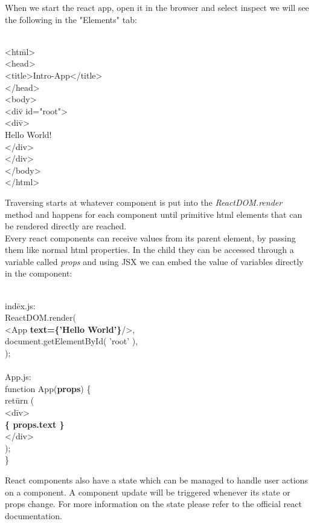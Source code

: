 When we start the react app, open it in the browser and select inspect we will see the following in the "Elements" tab:
\begin{exmp}
\label{ex252}
\begin{tabbing}
\\
<ht\=ml> \\
<head> \\
\> <title>Intro-App</title> \\
</head> \\
<body> \\
\> <di\=v id="root"> \\
\> \> <di\=v> \\
\> \> \> Hello World! \\
\> \> </div> \\
\> </div> \\
</body> \\
</html>
\end{tabbing}
\end{exmp}
Traversing starts at whatever component is put into the \emph{ReactDOM.render} method and happens for each component until primitive html elements that can be rendered directly are reached. \\
Every react components can receive values from its parent element, by passing them like normal html properties. In the child they can be accessed through a variable called \emph{props} and using JSX we can embed the value of variables directly in the component:

\begin{exmp}
\label{ex253}
\begin{tabbing}
\\
ind\=ex.js: \\
ReactDOM.render( \\
\>	<App \textbf{text=\{'Hello World'\}}/>, \\
\>	document.getElementById( 'root' ), \\
); \\
\\
App.js: \\
function App(\textbf{props}) \{ \\
\>  ret\=urn ( \\
\>\>    <d\=iv> \\
\>\>\>     \textbf{\{ props.text \}}\\
\>\>   </div> \\
\>  ); \\
\}
\end{tabbing}
\end{exmp}
React components also have a state which can be managed to handle user actions on a component. A component update will be triggered whenever its state or props change. For more information on the state please refer to the official react documentation.

